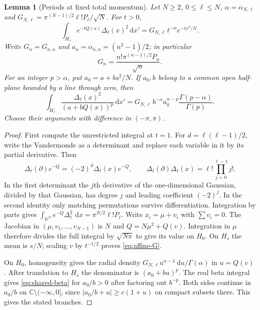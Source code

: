\documentclass[11pt]{article}
\numberwithin{equation}{section}
\newtheorem{lemma}[theorem]{Lemma}
\theoremstyle{definition}
\newcommand{\C}{\mathbb C}
\newcommand{\R}{\mathbb R}
\newcommand{\dd}{\,\mathrm d}
\begin{document}
\begin{lemma}[Periods at fixed total momentum]\label{lem:gaussian-period}
Let $N\ge2$, $0\le\ell\le N$, $\alpha=\alpha_{N,\ell}$ and
$G_{N,\ell}=\pi^{(N-1)/2}\ell!P_\ell/\sqrt N$.
For $t>0$,
\begin{equation}\label{eq:affine-G}
 \int_{H_s} e^{-tQ(x)}\Delta_\ell(x)^2\dd x'
 =G_{N,\ell}\,t^{-\alpha}e^{-ts^2/N}.
\end{equation}
Write $G_n=G_{n,n}$ and $a_n=\alpha_{n,n}=(n^2-1)/2$; in particular
\begin{equation}\label{eq:shared-G}
 G_n=\frac{n!\pi^{(n-1)/2}P_n}{\sqrt n}.
\end{equation}
For an integer $p>\alpha$, put $a_0=a+bs^2/N$. If $a_0,b$ belong
to a common open half-plane bounded by a line through zero, then
\begin{equation}\label{eq:shared-beta}
 \int_{H_s}\frac{\Delta_\ell(x)^2}{(a+bQ(x))^p}\dd x'
 =G_{N,\ell}\,b^{-\alpha}a_0^{\alpha-p}
             \frac{\Gamma(p-\alpha)}{\Gamma(p)} .
\end{equation}
Choose their arguments with difference in $(-\pi,\pi)$.
\end{lemma}
\begin{proof}
First compute the unrestricted integral at $t=1$. For
$d=\ell(\ell-1)/2$, write the Vandermonde as a determinant and replace
each variable in it by its partial derivative. Then
\[
 \Delta_\ell(\partial)e^{-Q}=(-2)^d\Delta_\ell(x)e^{-Q},
 \qquad \Delta_\ell(\partial)\Delta_\ell(x)
       =\ell!\prod_{j=0}^{\ell-1}j!.
\]
In the first determinant the $j$th derivative of the one-dimensional
Gaussian, divided by that Gaussian, has degree $j$ and leading
coefficient $(-2)^j$. In the second identity only matching
permutations survive differentiation. Integration by parts gives
$\int_{\R^N}e^{-Q}\Delta_\ell^2\,\dd x=\pi^{N/2}\ell!P_\ell$.
Write $x_i=\mu+v_i$ with $\sum v_i=0$. The Jacobian in
$(\mu,v_1,\ldots,v_{N-1})$ is $N$ and
$Q=N\mu^2+Q(v)$. Integration in $\mu$ therefore divides the full
integral by $\sqrt{N\pi}$ to give its value on $H_0$.
On $H_s$ the mean is $s/N$; scaling $v$ by $t^{-1/2}$
proves \eqref{eq:affine-G}.

On $H_0$, homogeneity gives the radial density
$G_{N,\ell}u^{\alpha-1}\dd u/\Gamma(\alpha)$ in $u=Q(v)$.
After translation to $H_s$ the denominator is $(a_0+bu)^p$.
The real beta integral gives \eqref{eq:shared-beta} for $a_0/b>0$
after factoring out $b^{-p}$. Both sides continue in $a_0/b$
on $\C\setminus(-\infty,0]$, since $|a_0/b+u|\ge c(1+u)$
on compact subsets there. This gives the stated branches.
\end{proof}
\end{document}
